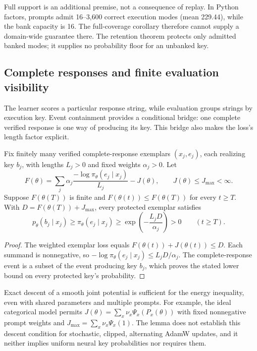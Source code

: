 Full support is an additional premise, not a consequence of replay. In
Python factors, prompts admit 16--3,600 correct execution modes (mean 229.44),
while the bank capacity is 16. The full-coverage corollary therefore cannot
supply a domain-wide guarantee there. The retention theorem protects only
admitted banked modes; it supplies no probability floor for an unbanked key.

\subsection{Complete responses and finite evaluation visibility}
\label{app:theory-exemplar-bridge}

The learner scores a particular response string, while evaluation groups
strings by execution key. Event containment provides a conditional bridge:
one complete verified response is one way of producing its key. This bridge
also makes the loss's length factor explicit.

\begin{lemma}
\label{lem:shared-exemplar-retention}
Fix finitely many verified complete-response exemplars $(x_j,e_j)$, each
realizing key $b_j$, with lengths $L_j>0$ and fixed weights $\alpha_j>0$.
Let
\[
 F(\theta)=\sum_j\alpha_j
 \frac{-\log\pi_\theta(e_j\mid x_j)}{L_j}-J(\theta),
 \qquad J(\theta)\le J_{\max}<\infty.
\]
Suppose $F(\theta(T))$ is finite and
$F(\theta(t))\le F(\theta(T))$ for every $t\ge T$. With
$D=F(\theta(T))+J_{\max}$, every protected exemplar satisfies
\[
 p_\theta(b_j\mid x_j)\ge\pi_\theta(e_j\mid x_j)
 \ge\exp\!\left(-\frac{L_jD}{\alpha_j}\right)>0
 \qquad(t\ge T).
\]
\end{lemma}
\begin{proof}
The weighted exemplar loss equals $F(\theta(t))+J(\theta(t))\le D$.
Each summand is nonnegative, so
$-\log\pi_\theta(e_j\mid x_j)\le L_jD/\alpha_j$.
The complete-response event is a subset of the event producing key $b_j$,
which proves the stated lower bound on every protected key's probability.
\end{proof}

Exact descent of a smooth joint potential is sufficient for the energy
inequality, even with shared parameters and multiple prompts. For example,
the ideal categorical model permits
$J(\theta)=\sum_x\nu_x\Psi_x(P_x(\theta))$ with fixed nonnegative prompt
weights and $J_{\max}=\sum_x\nu_x\Psi_x(1)$. The lemma does not establish
this descent condition for stochastic, clipped, alternating AdamW updates,
and it neither implies uniform neural key probabilities nor requires them.

